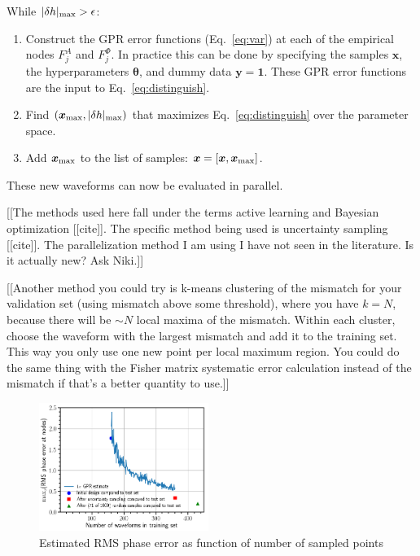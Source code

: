 \documentclass[prd,aps,letter,twocolumn,floatfix,notitlepage,nofootinbib]{revtex4-1}
\begin{document}
While $|\delta h |_{\rm max} > \epsilon$:
\begin{enumerate}
\item Construct the GPR error functions (Eq.~\eqref{eq:var}) at each of the empirical nodes $F^A_j$ and $F^\Phi_j$.
In practice this can be done by specifying the samples ${\bm x}$, the hyperparameters ${\bm \theta}$, and dummy 
data ${\bm y}={\bm 1}$. These GPR error functions are the input to Eq.~\eqref{eq:distinguish}.

\item Find $({\bm x}_{\rm max}, |\delta h |_{\rm max})$ that maximizes Eq.~\eqref{eq:distinguish} over the parameter space. 
\item Add ${\bm x}_{\rm max}$ to the list of samples: ${\bm x} = [{\bm x}, {\bm x}_{\rm max}]$.
\end{enumerate}
These new waveforms can now be evaluated in parallel.

[[The methods used here fall under the terms active learning and Bayesian optimization [[cite]]. The specific method being used is
uncertainty sampling [[cite]]. The parallelization method I am using I have not seen in the literature. Is it actually new? Ask Niki.]]


[[Another method you could try is k-means clustering of the mismatch for your validation set (using mismatch above some threshold), 
where you have $k=N$, because there will
be $\sim N$ local maxima of the mismatch. Within each cluster, choose the waveform with the largest mismatch and add it to the
training set. This way you only use one new point per local maximum region. You could do the same thing with the Fisher matrix
systematic error calculation instead of the mismatch if that's a better quantity to use.]]

\begin{figure}[htb]
\centering
\includegraphics[width=0.49\textwidth]{uncertaintysampling.png}
\caption{Estimated RMS phase error as function of number of sampled points}
\label{fig:phaserange}
\end{figure}
\end{document}
